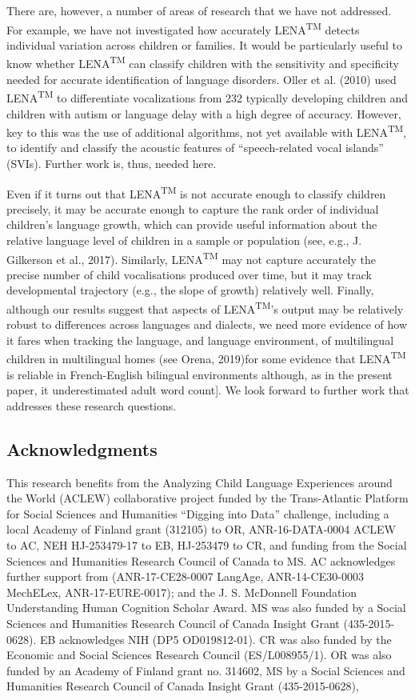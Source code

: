 \documentclass[english,floatsintext,man]{apa6}
\begin{document}
There are, however, a number of areas of research that we have not
addressed. For example, we have not investigated how accurately
LENA\textsuperscript{TM} detects individual variation across children or
families. It would be particularly useful to know whether
LENA\textsuperscript{TM} can classify children with the sensitivity and
specificity needed for accurate identification of language disorders.
Oller et al. (2010) used LENA\textsuperscript{TM} to differentiate
vocalizations from 232 typically developing children and children with
autism or language delay with a high degree of accuracy. However, key to
this was the use of additional algorithms, not yet available with
LENA\textsuperscript{TM}, to identify and classify the acoustic features
of \enquote{speech-related vocal islands} (SVIs). Further work is, thus,
needed here.

Even if it turns out that LENA\textsuperscript{TM} is not accurate
enough to classify children precisely, it may be accurate enough to
capture the rank order of individual children's language growth, which
can provide useful information about the relative language level of
children in a sample or population (see, e.g., J. Gilkerson et al.,
2017). Similarly, LENA\textsuperscript{TM} may not capture accurately
the precise number of child vocalisations produced over time, but it may
track developmental trajectory (e.g., the slope of growth) relatively
well. Finally, although our results suggest that aspects of
LENA\textsuperscript{TM}'s output may be relatively robust to
differences across languages and dialects, we need more evidence of how
it fares when tracking the language, and language environment, of
multilingual children in multilingual homes (see Orena, 2019)for some
evidence that LENA\textsuperscript{TM} is reliable in French-English
bilingual environments although, as in the present paper, it
underestimated adult word count{]}. We look forward to further work that
addresses these research questions.

\subsection{Acknowledgments}\label{acknowledgments}

This research benefits from the Analyzing Child Language Experiences
around the World (ACLEW) collaborative project funded by the
Trans-Atlantic Platform for Social Sciences and Humanities
\enquote{Digging into Data} challenge, including a local Academy of
Finland grant (312105) to OR, ANR-16-DATA-0004 ACLEW to AC, NEH
HJ-253479-17 to EB, HJ-253479 to CR, and funding from the Social
Sciences and Humanities Research Council of Canada to MS. AC
acknowledges further support from (ANR-17-CE28-0007 LangAge,
ANR-14-CE30-0003 MechELex, ANR-17-EURE-0017); and the J. S. McDonnell
Foundation Understanding Human Cognition Scholar Award. MS was also
funded by a Social Sciences and Humanities Research Council of Canada
Insight Grant (435-2015-0628). EB acknowledges NIH (DP5 OD019812-01). CR
was also funded by the Economic and Social Sciences Research Council
(ES/L008955/1). OR was also funded by an Academy of Finland grant no.
314602, MS by a Social Sciences and Humanities Research Council of
Canada Insight Grant (435-2015-0628),
\end{document}
